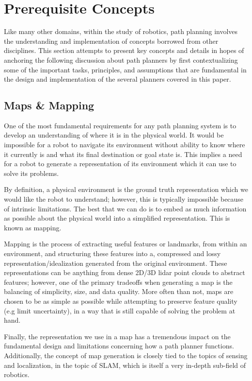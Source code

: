 \section{Prerequisite Concepts}

Like many other domains, within the study of robotics, path planning involves the understanding and implementation of concepts borrowed from other disciplines. This section attempts to present key concepts and details in hopes of anchoring the following discussion about path planners by first contextualizing some of the important tasks, principles, and assumptions that are fundamental in the design and implementation of the several planners covered in this paper. 


\subsection{Maps \& Mapping}

One of the most fundamental requirements for any path planning system is to develop an understanding of where it is in the physical world. It would be impossible for a robot to navigate its environment without ability to know where it currently is and what its final destination or goal state is. This implies a need for a robot to generate a representation of its environment which it can use to solve its problems. 

By definition, a physical environment is the ground truth representation which we would like the robot to understand; however, this is typically impossible because of intrinsic limitations. The best that we can do is to embed as much information as possible about the physical world into a simplified representation. This is known as mapping.  

Mapping is the process of extracting useful features or landmarks, from within an environment, and structuring these features into a, compressed and lossy representation/idealization generated from the original environment. These representations can be anything from dense 2D/3D lidar point clouds to abstract features; however, one of the primary tradeoffs when generating a map is the balancing of simplicity, size, and data quality. More often than not, maps are chosen to be as simple as possible while attempting to preserve feature quality (e.g limit uncertainty), in a way that is still capable of solving the problem at hand.  

Finally, the representation we use in a map has a tremendous impact on the fundamental design and limitations concerning how a path planner functions. Additionally, the concept of map generation is closely tied to the topics of sensing and localization, in the topic of SLAM, which is itself a very in-depth sub-field of robotics. \linebreak  

